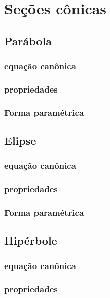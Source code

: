 
\chapter{Seções cônicas}\label{chap:conicas}

\emconstrucao

\section{Parábola}
\subsection{equação canônica}
\subsection{propriedades}
\subsection{Forma paramétrica}

\section{Elipse}
\subsection{equação canônica}
\subsection{propriedades}
\subsection{Forma paramétrica}

\section{Hipérbole}
\subsection{equação canônica}
\subsection{propriedades}
